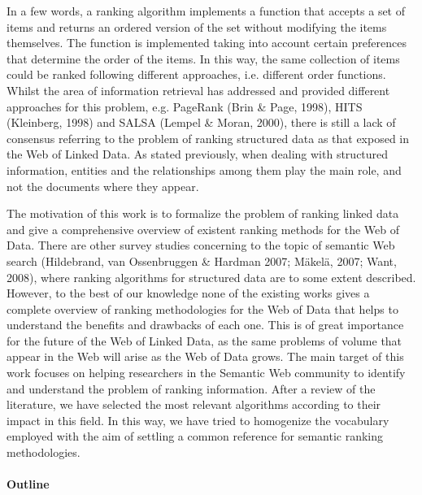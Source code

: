 In a few words, a ranking algorithm implements a function that accepts a set of items and returns an ordered version of the set without modifying the items themselves. The function is implemented taking into account certain preferences that determine the order of the items. In this way, the same collection of items could be ranked following different approaches, i.e. different order functions. Whilst the area of information retrieval has addressed and provided different approaches for this problem, e.g. PageRank (Brin \& Page, 1998), HITS (Kleinberg, 1998) and SALSA (Lempel \& Moran, 2000), there is still a lack of consensus referring to the problem of ranking structured data as that exposed in the Web of Linked Data. As stated previously, when dealing with structured information, entities and the relationships among them play the main role, and not the documents where they appear.

The motivation of this work is to formalize the problem of ranking linked data and give a comprehensive overview of existent ranking methods for the Web of Data. There are other survey studies concerning to the topic of semantic Web search (Hildebrand, van Ossenbruggen \& Hardman 2007; Mäkelä, 2007; Want, 2008), where ranking algorithms for structured data are to some extent described. However, to the best of our knowledge none of the existing works gives a complete overview of ranking methodologies for the Web of Data that helps to understand the benefits and drawbacks of each one. This is of great importance for the future of the Web of Linked Data, as the same problems of volume that appear in the Web will arise as the Web of Data grows. The main target of this work focuses on helping researchers in the Semantic Web community to identify and understand the problem of ranking information. After a review of the literature, we have selected the most relevant algorithms according to their impact in this field. In this way, we have tried to homogenize the vocabulary employed with the aim of settling a common reference for semantic ranking methodologies.

\paragraph{Outline}
